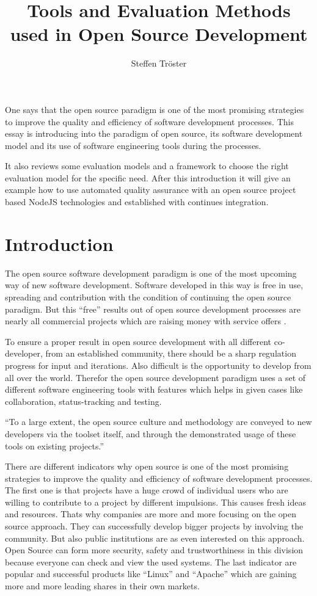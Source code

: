 \documentclass[DIV=calc,paper=a4,fontsize=9pt,twocolumn]{scrartcl}
\title{Tools and Evaluation Methods used in Open Source Development}
\author{Steffen Tröster \\}
\date{}
\newcommand{\initial}[1]{
     \lettrine[lines=2,lhang=0.3,nindent=0em]{
                    \color{headblue}
                    {\textsf{#1}}}{}}
\begin{document}
\maketitle
\thispagestyle{fancy}		

\initial{O}ne says that the open source paradigm is one of the most promising strategies to improve the quality and efficiency of software development processes. This essay is introducing into the paradigm of open source, its software development model and its use of software engineering tools during the processes.

It also reviews some evaluation models and a framework to choose the right evaluation model for the specific need. After this introduction it will give an example how to use automated quality assurance with an open source project based NodeJS technologies and established with continues integration.

\section{Introduction}

The open source software development paradigm is one of the most upcoming way of new software development. Software developed in this way is free in use, spreading and contribution with the condition of continuing the open source paradigm. But this \enquote{free} results out of open source development processes are nearly all commercial projects which are raising money with service offers \citep{Wheeler}.

To ensure a proper result in open source development with all different co-developer, from an established community, there should be a sharp regulation progress for input and iterations. Also difficult is the opportunity to develop from all over the world. Therefor the open source development paradigm uses a set of different software engineering tools with features which helps in given cases like collaboration, status-tracking and testing.

\enquote{To a large extent, the open source culture and methodology are conveyed to new developers via the toolset itself, and through the demonstrated usage of these tools on existing projects.} \citep{Robbins02adoptingoss}

There are different indicators why open source is one of the most promising strategies to improve the quality and efficiency of software development processes. The first one is that projects have a huge crowd of individual users who are willing to contribute to a project by different impulsions. This causes fresh ideas and resources. Thats why companies are more and more focusing on the open source approach. They can successfully develop bigger projects by involving the community. But also public institutions are as even interested on this approach. Open Source can form more security, safety and trustworthiness in this division because everyone can check and view the used systems. The last indicator are popular and successful products like \enquote{Linux} and \enquote{Apache} which are gaining more and more leading shares in their own markets. \citep{fuggetta2003open}
\end{document}
